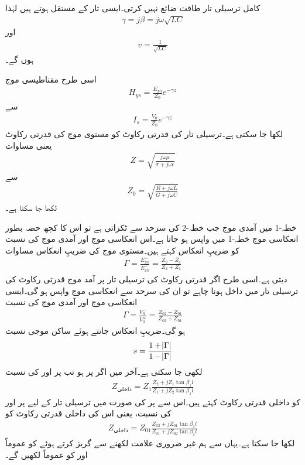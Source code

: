 کامل ترسیلی تار طاقت ضائع نہیں کرتی۔ایسی تار کے مستقل  ہوتے ہیں لہٰذا
\begin{align*}
\gamma=j \beta=j \omega \sqrt{LC}
\end{align*}
اور 
\begin{align}
v=\frac{1}{\sqrt{LC}}
\end{align}
ہوں گے۔

اسی طرح مقناطیسی موج
\begin{align*}
H_{ys}=\frac{E_{x0}}{Z_0} e^{-\gamma z}
\end{align*}
سے
\begin{align}
I_s=\frac{V_0}{Z_0} e^{-\gamma z}
\end{align}
لکھا جا سکتی ہے۔ترسیلی تار کی قدرتی رکاوٹ  کو مستوی موج کی قدرتی رکاوٹ یعنی مساوات 
\begin{align*}
Z=\sqrt{\frac{j\omega \mu}{\sigma +j\omega \epsilon}}
\end{align*}
سے
\begin{align}
Z_0=\sqrt{\frac{R+j\omega L}{G+j \omega C}}
\end{align}
لکھا جا سکتا ہے۔

خطہ-1 میں آمدی موج جب خطہ-2 کی سرحد سے ٹکراتی ہے تو اس کا کچھ حصہ بطور انعکاسی موج خطہ-1 میں واپس ہو جاتا ہے۔اس انعکاسی موج اور آمدی موج کی نسبت کو ضریبِ انعکاس کہتے ہیں۔مستوی موج کی ضریبِ انعکاس مساوات 
\begin{align*}
\Gamma=\frac{E_{x0}^-}{E_{x0}^+}=\frac{Z_2-Z_1}{Z_2+Z_1}
\end{align*}
دیتی ہے۔اسی طرح اگر  قدرتی رکاوٹ کی ترسیلی تار پر آمد موج  قدرتی رکاوٹ کی ترسیلی تار میں داخل ہونا چاہے تو ان کی سرحد سے انعکاسی موج واپس ہو گی۔ایسی انعکاسی موج اور آمدی موج کی نسبت
\begin{align}
\Gamma=\frac{V_0^-}{V_0^+}=\frac{Z_{02}-Z_{01}}{Z_{02}+Z_{01}}
\end{align}
 ہو گی۔ضریبِ انعکاس جانتے ہوئے ساکن موجی نسبت
\begin{align}
s=\frac{1+\abs{\Gamma}}{1-\abs{\Gamma}}
\end{align}
لکھی جا سکتی ہے۔آخر میں اگر  پر  ہو تب  پر  اور  کی نسبت
\begin{align*}
Z_{\text{داخلی}}=Z_1 \frac{Z_2+j Z_1 \tan \beta_1 l}{Z_1 +j Z_2 \tan \beta_1 l}
\end{align*}
کو داخلی قدرتی رکاوٹ  کہتے ہیں۔اس سے  پر  کی صورت میں ترسیلی تار کے لیے  پر  اور  کی نسبت، یعنی اس کی داخلی قدرتی رکاوٹ کو
\begin{align}\label{مساوات_ترسیلی_داخلی_قدرتی_رکاوٹ_تعریف}
Z_{\text{داخلی}}=Z_{01} \frac{Z_{02}+j Z_{01}\tan \beta_1 l}{Z_{01}+j Z_{02}\tan \beta_1 l}
\end{align}
لکھا جا سکتا ہے۔یہاں سے ہم غیر ضروری علامت لکھنے سے گریز کرتے ہوئے  کو عموماً  اور  کو عموماً  لکھیں گے۔



